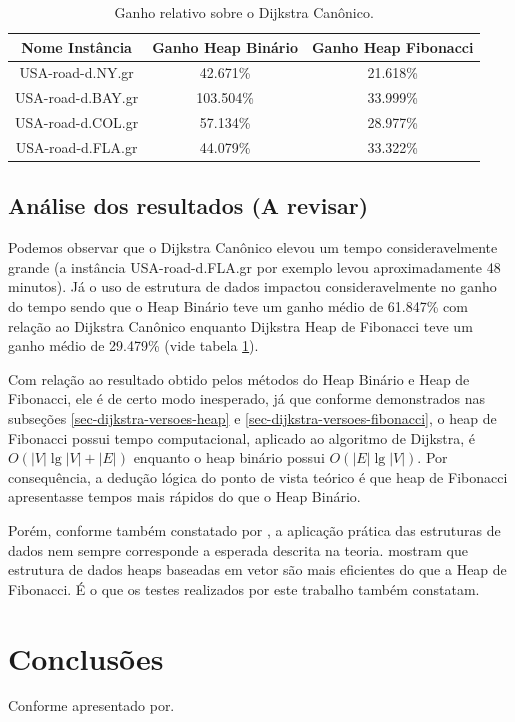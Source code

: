 \begin{table}[H]
\caption{Ganho relativo sobre o Dijkstra Canônico.}
\label{tbl-dijkstra-resultados-speedup}
\centering
\begin{adjustbox}{max width=\textwidth}
\begin{tabular}{|c|c|c|}
\hline
\textbf{Nome Instância} & \textbf{Ganho Heap Binário} & \textbf{Ganho Heap Fibonacci} \\ \hline
USA-road-d.NY.gr        & 42.671\%                       & 21.618\%                         \\ \hline
USA-road-d.BAY.gr       & 103.504\%                      & 33.999\%                         \\ \hline
USA-road-d.COL.gr       & 57.134\%                       & 28.977\%                         \\ \hline
USA-road-d.FLA.gr       & 44.079\%                       & 33.322\%                         \\ \hline
\end{tabular}
\end{adjustbox}
\end{table}

\subsection{Análise dos resultados (A revisar)}
\label{sec-dijkstra-experimentos-analise}
Podemos observar que o Dijkstra Canônico elevou um tempo consideravelmente grande (a instância USA-road-d.FLA.gr por exemplo levou aproximadamente 48 minutos). Já o uso de estrutura de dados impactou consideravelmente no ganho do tempo sendo que o Heap Binário teve um ganho médio de 61.847\% com relação ao Dijkstra Canônico enquanto Dijkstra Heap de Fibonacci teve um ganho médio de 29.479\% (vide tabela \ref{tbl-dijkstra-resultados-speedup}).

Com relação ao resultado obtido pelos métodos do Heap Binário e Heap de Fibonacci, ele é de certo modo inesperado, já que conforme demonstrados nas subseções \ref{sec-dijkstra-versoes-heap} e \ref{sec-dijkstra-versoes-fibonacci}, o heap de Fibonacci possui tempo computacional, aplicado ao algoritmo de Dijkstra, é $O(|V|\lg |V| + |E|)$ enquanto o heap binário possui $O(|E| \lg |V|)$. Por consequência, a dedução lógica do ponto de vista teórico é que heap de Fibonacci apresentasse tempos mais rápidos do que o Heap Binário.

Porém, conforme também constatado por , a aplicação prática das estruturas de dados nem sempre corresponde a esperada descrita na teoria.  mostram que estrutura de dados heaps baseadas em vetor são mais eficientes do que a Heap de Fibonacci. É o que os testes realizados por este trabalho também constatam.

\section{Conclusões}
\label{sec-dijkstra-conclusoes}
Conforme apresentado por.